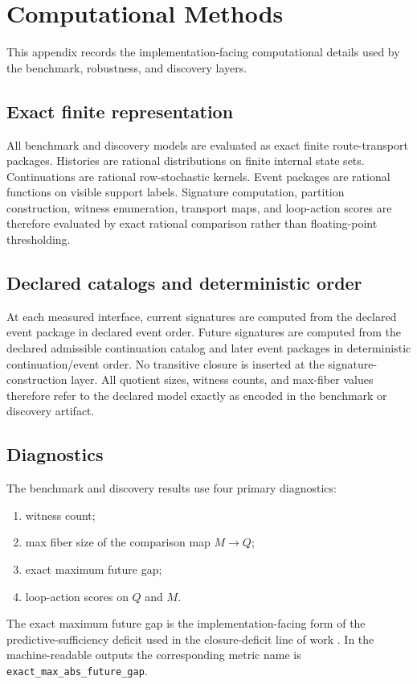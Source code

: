 \documentclass[11pt]{article}
\newcommand{\CurrentQ}{Q}
\newcommand{\PredictiveQ}{M}
\theoremstyle{definition}
\begin{document}
\section{Computational Methods}\label{app:computational-methods}
This appendix records the implementation-facing computational details used by the benchmark, robustness, and discovery layers.

\subsection{Exact finite representation}\label{appsubsec:comp-exact}
All benchmark and discovery models are evaluated as exact finite route-transport packages. Histories are rational distributions on finite internal state sets. Continuations are rational row-stochastic kernels. Event packages are rational functions on visible support labels. Signature computation, partition construction, witness enumeration, transport maps, and loop-action scores are therefore evaluated by exact rational comparison rather than floating-point thresholding.

\subsection{Declared catalogs and deterministic order}\label{appsubsec:comp-order}
At each measured interface, current signatures are computed from the declared event package in declared event order. Future signatures are computed from the declared admissible continuation catalog and later event packages in deterministic continuation/event order. No transitive closure is inserted at the signature-construction layer. All quotient sizes, witness counts, and max-fiber values therefore refer to the declared model exactly as encoded in the benchmark or discovery artifact.

\subsection{Diagnostics}\label{appsubsec:comp-diagnostics}
The benchmark and discovery results use four primary diagnostics:
\begin{enumerate}
\item witness count;
\item max fiber size of the comparison map $\PredictiveQ \to \CurrentQ$;
\item exact maximum future gap;
\item loop-action scores on $\CurrentQ$ and $\PredictiveQ$.
\end{enumerate}
The exact maximum future gap is the implementation-facing form of the predictive-sufficiency deficit used in the closure-deficit line of work \citep{Tsiokos2026CastStone}. In the machine-readable outputs the corresponding metric name is \texttt{exact\_max\_abs\_future\_gap}.
\end{document}
